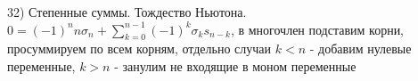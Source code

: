 32) Степенные суммы. Тождество Ньютона.\\

$0=(-1)^n n\sigma_n + \sum_{k=0}^{n-1}(-1)^k \sigma_k s_{n-k}$, в многочлен подставим корни, просуммируем по всем корням, отдельно случаи $k < n$ - добавим нулевые переменные, $k > n$ - занулим не входящие в моном переменные\\
\\
